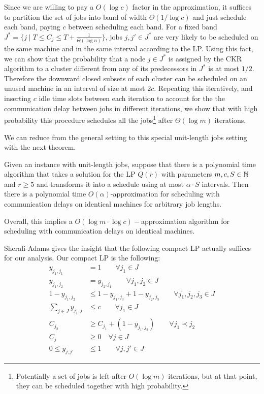 Since we are willing to pay a $O(\log c)$ factor in the approximation, 
it suffices to partition the set of jobs into band of width $\Theta(1/\log c)$ and just schedule each band, paying $c$ between scheduling each band.
For a fixed band $J^* = \{j \mid T \leq C_j \leq T + \frac{1}{\Theta( \log n)}\}$, jobs $j,j' \in J^*$ are very likely to be scheduled on the same machine and in the 
same interval according to the LP. Using this fact, we can show that 
 the probability that a node $j \in J^*$ is assigned by the CKR algorithm to a cluster different from any of its predecessors in $J^*$ is at most $1/2$.   
Therefore the downward closed subsets of each cluster can be scheduled on an unused machine in an interval of size at most $2c$.
Repeating this iteratively, and inserting $c$ idle time slots between each iteration to account for the the communication delay between jobs in different iterations,
we show that with high probability this procedure schedules all the jobs\footnote{Potentially a set of jobs is left after $O(\log m)$ iterations, 
but at that point, they can be scheduled together with high probability.} after $\Theta(\log m)$ iterations. 



We can reduce from the general setting to this special unit-length jobs setting with the next theorem.
\begin{theorem}
  Given an instance with unit-length jobs, 
  suppose that there is a polynomial time algorithm that takes a solution for the LP $Q(r)$ with parameters $m,c,S \in \mathbb{N}$ and $r \geq 5$
  and transforms it into a schedule using at most $\alpha \cdot S$
  intervals. Then there is a polynomial time  $O(\alpha)$-approximation for scheduling with communication delays on identical machines for arbitrary job lengths.
\end{theorem}
Overall, this implies a $O(\log m \cdot \log c)-$approximation algorithm for scheduling with communication delays on identical machines.


Sherali-Adams gives the insight that the following compact LP actually suffices for our analysis.
Our compact LP is the following: 
\begin{align*}
y_{j_1,j_1}&=1 \qquad \forall j_1 \in J\\
y_{j_1,j_2} &= y_{j_2,j_1} \qquad \forall j_1,j_2 \in J\\
1-y_{j_1,j_2} &\leq 1-y_{j_1,j_3} + 1-y_{j_2,j_3} \qquad \forall j_1,j_2,j_3 \in J\\
\sum_{j \in J} y_{j_1,j} &\leq c \qquad \forall j_1 \in J\\
 C_{j_2} &\geq C_{j_1} + (1-y_{j_1,j_2}) \qquad \forall j_1 \prec j_2 \\
  C_j &\geq 0 \quad \forall j \in J \\
  0 \leq y_{j,j'} &\leq 1 \qquad \forall j,j' \in J
\end{align*}

